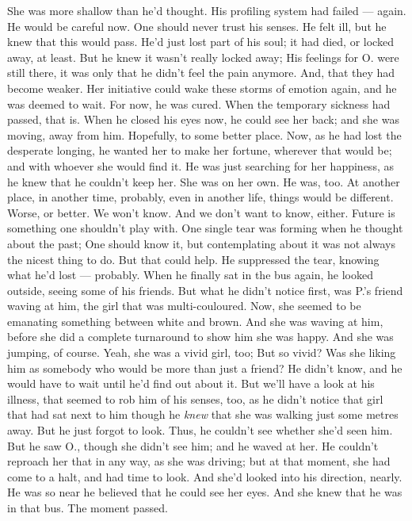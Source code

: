 She was more shallow than he'd thought. 
His profiling system had failed --- again. 
He would be careful now. 
One should never trust his senses. 
He felt ill, but he knew that this would pass. 
He'd just lost part of his soul; it had died, or locked away, at least. 
But he knew it wasn't really locked away; His feelings for O. were still there, it was only that he didn't feel the pain anymore. 
And, that they had become weaker. 
Her initiative could wake these storms of emotion again, and he was deemed to wait. 
For now, he was cured. 
When the temporary sickness had passed, that is. 
When he closed his eyes now, he could see her back; and she was moving, away from him. 
Hopefully, to some better place. 
Now, as he had lost the desperate longing, he wanted her to make her fortune, wherever that would be; and with whoever she would find it. 
He was just searching for her happiness, as he knew that he couldn't keep her. 
She was on her own. 
He was, too. 
At another place, in another time, probably, even in another life, things would be different. 
Worse, or better. 
We won't know. 
And we don't want to know, either. 
Future is something one shouldn't play with. 
One single tear was forming when he thought about the past; One should know it, but contemplating about it was not always the nicest thing to do. 
But that could help. 
He suppressed the tear, knowing what he'd lost --- probably. 
When he finally sat in the bus again, he looked outside, seeing some of his friends. 
But what he didn't notice first, was P.'s friend waving at him, the girl that was multi-couloured. Now, she seemed to be emanating something between white and brown. 
And she was waving at him, before she did a complete turnaround to show him she was happy. 
And she was jumping, of course. 
Yeah, she was a vivid girl, too; But so vivid?
Was she liking him as somebody who would be more than just a friend?
He didn't know, and he would have to wait until he'd find out about it. 
But we'll have a look at his illness, that seemed to rob him of his senses, too, as he didn't notice that girl that had sat next to him though he \emph{knew} that she was walking just some metres away. 
But he just forgot to look. 
Thus, he couldn't see whether she'd seen him. 
But he saw O., though she didn't see him; and he waved at her. 
He couldn't reproach her that in any way, as she was driving; but at that moment, she had come to a halt, and had time to look. 
And she'd looked into his direction, nearly. 
He was so near he believed that he could see her eyes. 
And she knew that he was in that bus. 
The moment passed. 
